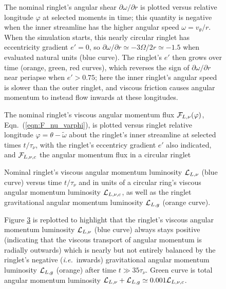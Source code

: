 \documentclass[preprint]{aastex62}
\begin{document}
\begin{figure}
    \caption{
        \label{fig:nominal_shear}
        The nominal ringlet's angular shear $\partial\omega/\partial r$ is plotted versus relative 
        longitude $\varphi$ at selected moments in time; this quantity is negative when the inner streamline
        has the higher angular speed $\omega=v_\theta/r$. When the simulation starts, this nearly circular
        ringlet has eccentricity gradient $e'=0$, so $\partial\omega/\partial r\simeq-3\Omega/2r\simeq-1.5$ 
        when evaluated natural units (blue curve).
        The ringlet's $e'$ then grows over time (orange, green, red curves),
        which reverses the sign of $\partial\omega/\partial r$
        near periapse when $e'>0.75$; here the inner ringlet's angular speed
        is slower than the outer ringlet, and viscous friction causes angular momentum to instead flow inwards
        at these longitudes. 
    }
\end{figure}

\begin{figure}
    \caption{
        \label{fig:F_nu_nominal}
        The nominal ringlet's viscous angular momentum flux ${\cal F}_{L,\nu}(\varphi)$,
        Eqn.\ (\ref{eqn:F_nu_varphi}), is plotted versus ringlet
        relative longitude $\varphi=\theta-\tilde{\omega}$ about the ringlet's inner
        streamline at selected times $t/\tau_\nu$, 
        with the ringlet's eccentricy gradient $e'$ also indicated, 
        and ${\cal F}_{L,\nu,c}$ the angular momentum flux in a circular ringlet
    }
\end{figure}

\begin{figure}
    \caption{
        \label{fig:angular_momentum_luminosity_nominal}
        Nominal ringlet's viscous angular momentum luminosity ${\cal L}_{L,\nu}$ (blue curve) versus time $t/\tau_\nu$
        and in units of a circular ring's viscous angular momentum luminosity ${\cal L}_{L,\nu,c}$, 
        as well as the ringlet gravitational angular momentum luminosity ${\cal L}_{L,g}$ (orange curve).
    }
\end{figure}

\begin{figure}
    \caption{
        \label{fig:angular_momentum_luminosity_zoom_nominal}
        Figure \ref{fig:angular_momentum_luminosity_nominal} is replotted to highlight that the ringlet's 
        viscous angular momentum luminosity ${\cal L}_{L,\nu}$ (blue curve)
        always stays positive (indicating that the viscous transport of angular momentum is radially outwards) which is 
        nearly but not entirely balanced by the ringlet's negative ({\it i.e.}\ inwards) gravitational angular momentum luminosity 
        ${\cal L}_{L,g}$ (orange) after time $t\gg35\tau_\nu$. Green curve is total angular momentum luminosity 
        ${\cal L}_{L,\nu} + {\cal L}_{L,g}\simeq0.001{\cal L}_{L,\nu,c}$.
    }
\end{figure}
\end{document}
